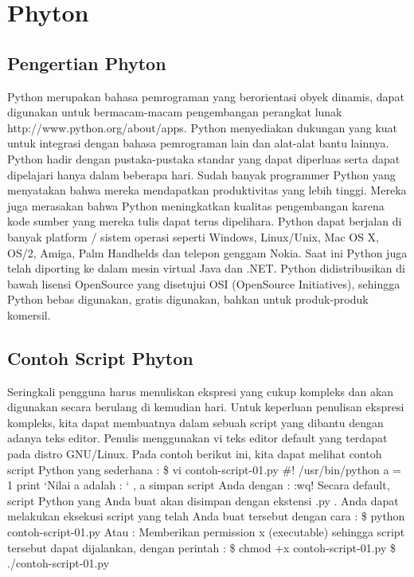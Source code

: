 
\section{Phyton} 
\subsection{Pengertian Phyton}
Python merupakan bahasa pemrograman yang
berorientasi obyek dinamis, dapat digunakan
untuk bermacam-macam pengembangan perangkat
lunak http://www.python.org/about/apps. Python
menyediakan dukungan yang kuat untuk integrasi
dengan bahasa pemrograman lain dan alat-alat
bantu lainnya. Python hadir dengan pustaka-pustaka
standar yang dapat diperluas serta dapat
dipelajari hanya dalam beberapa hari. Sudah
banyak programmer Python yang menyatakan
bahwa mereka mendapatkan produktivitas yang
lebih tinggi. Mereka juga merasakan bahwa Python
meningkatkan kualitas pengembangan karena kode
sumber yang mereka tulis dapat terus dipelihara.
Python dapat berjalan di banyak platform / sistem
operasi seperti Windows, Linux/Unix, Mac OS X,
OS/2, Amiga, Palm Handhelds dan telepon genggam
Nokia. Saat ini Python juga telah diporting ke dalam
mesin virtual Java dan .NET.
Python didistribusikan di bawah lisensi
OpenSource yang disetujui OSI (OpenSource
Initiatives), sehingga Python bebas digunakan,
gratis digunakan, bahkan untuk produk-produk
komersil.

\subsection{Contoh Script Phyton}
Seringkali pengguna harus menuliskan ekspresi yang cukup kompleks dan akan digunakan secara berulang di kemudian hari. 
Untuk keperluan penulisan ekspresi kompleks, kita dapat membuatnya dalam sebuah script yang dibantu dengan adanya teks editor. 
Penulis menggunakan vi teks editor default yang terdapat pada distro GNU/Linux. Pada contoh berikut ini, 
kita dapat melihat contoh script Python yang sederhana : 
\$ vi contoh-script-01.py \#! /usr/bin/python a = 1 print 
‘Nilai a adalah : ‘ , a simpan script Anda dengan : :wq! Secara default, script Python yang Anda buat akan disimpan dengan ekstensi .py . 
Anda dapat melakukan eksekusi script yang telah Anda buat tersebut dengan cara : 
\$ python contoh-script-01.py 
Atau : Memberikan permission x (executable) sehingga script tersebut dapat dijalankan, 
dengan perintah : \$ chmod +x contoh-script-01.py \$ ./contoh-script-01.py


